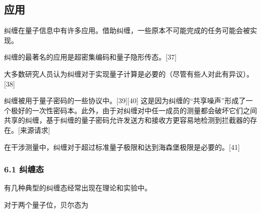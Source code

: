 \subsection{应用}
纠缠在量子信息中有许多应用。借助纠缠，一些原本不可能完成的任务可能会被实现。

纠缠的最著名的应用是超密集编码和量子隐形传态。[37]

大多数研究人员认为纠缠对于实现量子计算是必要的（尽管有些人对此有异议）。[38]

纠缠被用于量子密码的一些协议中。[39][40] 这是因为纠缠的“共享噪声”形成了一个极好的一次性密码本。此外，由于对纠缠对中任一成员的测量都会破坏它们之间共享的纠缠，基于纠缠的量子密码允许发送方和接收方更容易地检测到拦截器的存在。[来源请求]

在干涉测量中，纠缠对于超过标准量子极限和达到海森堡极限是必要的。[41]

\subsubsection{6.1 纠缠态}
有几种典型的纠缠态经常出现在理论和实验中。

对于两个量子位，贝尔态为